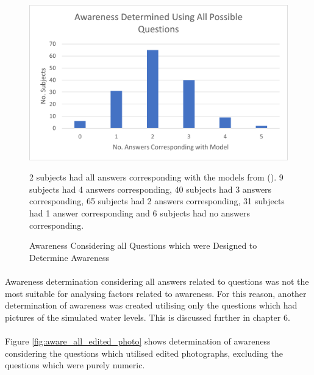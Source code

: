 \begin{figure}[H]
    \centering
    \includegraphics{fig_results/aware_all.png}
    \caption{Awareness Considering all Questions which were Designed to Determine Awareness}{  2 subjects had all answers corresponding with the models from (\cite{kartverket_se_2021}). 9 subjects had 4 answers corresponding, 40 subjects had 3 answers corresponding, 65 subjects had 2 answers corresponding, 31 subjects had 1 answer corresponding and 6 subjects had no answers corresponding. }
    \label{fig:aware_all_qs}
\end{figure}
\paragraph{}

Awareness determination considering all answers related to questions was not the most suitable for analysing factors related to awareness. For this reason, another determination of awareness was created utilising only the questions which had pictures of the simulated water levels. This is discussed further in chapter 6. 
\paragraph{}
Figure \ref{fig:aware_all_edited_photo} shows determination of awareness considering the questions which utilised edited photographs, excluding the questions which were purely numeric. 

